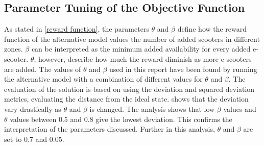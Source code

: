 \subsection{Parameter Tuning of the Objective Function}
As stated in \cref{reward function}, the parameters $\theta$ and $\beta$ define how the reward function of the alternative model values the number of added scooters in different zones. $\beta$ can be interpreted as the minimum added availability for every added e-scooter. $\theta$, however, describe how much the reward diminish as more e-scooters are added. The values of $\theta$ and $\beta$ used in this report have been found by running the alternative model with a combination of different values for $\theta$ and $\beta$. The evaluation of the solution is based on using the deviation and squared deviation metrics, evaluating the distance from the ideal state.  shows that the deviation vary drastically as  $\theta$ and $\beta$ is changed. The analysis shows that low $\beta$ values and $\theta$ values between $0.5$ and $0.8$ give the lowest deviation. This confirms the interpretation of the parameters discussed. Further in this analysis, $\theta$ and $\beta$ are  set to $0.7$ and $0.05$.

